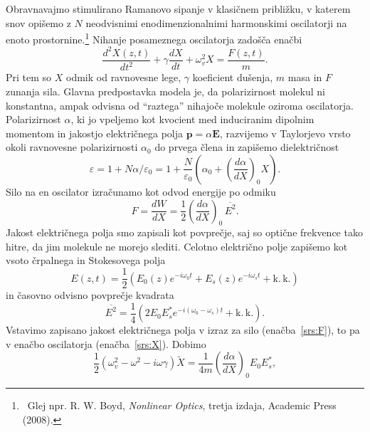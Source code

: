 Obravnavajmo stimulirano Ramanovo sipanje v klasičnem približku, v katerem snov opišemo 
z $N$ neodvisnimi enodimenzionalnimi harmonskimi oscilatorji na enoto prostornine.\footnote{~Glej npr. 
R. W. Boyd, {\it Nonlinear Optics}, tretja izdaja, Academic Press (2008).} Nihanje
posameznega oscilatorja zadošča enačbi
\begin{equation}
\frac{d^2X(z,t)}{dt^2}+ \gamma \frac{dX}{dt}+\omega_v^2X = \frac{F(z,t)}{m}.
\label{srs:X}
\end{equation}
Pri tem so $X$ odmik od ravnovesne lege, $\gamma$ koeficient dušenja, $m$ masa in $F$ zunanja sila.
Glavna predpostavka modela je, da polarizirnost molekul ni konstantna, ampak odvisna od 
``raztega'' nihajoče molekule oziroma oscilatorja. Polarizirnost $\alpha$, ki jo vpeljemo
kot kvocient med induciranim dipolnim momentom in jakostjo električnega polja $\mathbf{p} = \alpha \mathbf{E}$,
razvijemo v Taylorjevo vrsto okoli ravnovesne polarizirnosti  $\alpha_0$ do prvega člena in zapišemo dielektričnost
\begin{equation}
\varepsilon = 1+N\alpha/\varepsilon_0 = 1+\frac{N}{\varepsilon_0}\left(\alpha_0 + \left(\frac{d\alpha}{dX}\right) _0 X\right)\!.\label{srs:a}
\end{equation}
Silo na en oscilator izračunamo kot odvod energije po odmiku
\begin{equation}
F = \frac{dW}{dX}= \frac{1}{2}\left(\frac{d\alpha}{dX}\right)_0\,\overline{E^2}.
\label{srs:F}
\end{equation}
Jakost električnega polja smo zapisali kot povprečje, saj so optične frekvence 
tako hitre, da jim molekule ne morejo slediti. 
Celotno električno polje zapišemo kot vsoto črpalnega in Stokesovega polja
\begin{equation}
E(z,t)= \frac{1}{2}\left( E_0(z)e^{-i\omega_0t}+ E_s(z)e^{-i\omega_st} + \mathrm{k.\,k.}\right)
\label{eq:srsE}
\end{equation}
in časovno odvisno povprečje kvadrata
\begin{equation}
\overline{E^2} = \frac{1}{4}\left(2E_0E_s^* e^{-i(\omega_0-\omega_s)t}+\mathrm{k.\,k.}\right)\!.
\end{equation}
Vstavimo zapisano jakost električnega polja v izraz za silo (enačba~\ref{srs:F}),
to pa v enačbo oscilatorja (enačba~\ref{srs:X}). Dobimo
\begin{equation}
\frac{1}{2}\left(\omega_v^2-\omega^2-i\omega\gamma\right)\tilde{X} = 
\frac{1}{4m}\left(\frac{d\alpha}{dX}\right)_0 E_0 E_s^*,
\end{equation}
